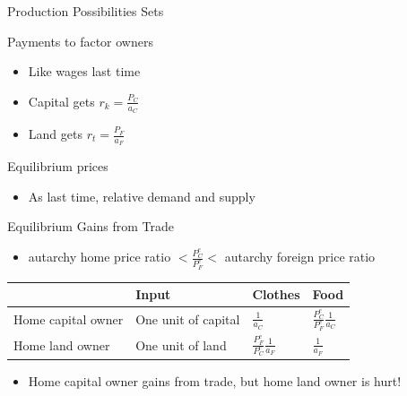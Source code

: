 \documentclass[ignorenonframetext,]{beamer}
\begin{document}
\begin{frame}{Production Possibilities Sets}

\end{frame}

\begin{frame}{Payments to factor owners}

    \begin{itemize}
        \item Like wages last time 
        \item Capital gets $r_k = \frac{P_C}{a_C}$
        \item Land gets $r_t = \frac{P_F}{a_F}$
    \end{itemize}

\end{frame}

\begin{frame}{Equilibrium prices}

    \begin{itemize}
        \item As last time, relative demand and supply
    \end{itemize}

\end{frame}

\begin{frame}{Equilibrium Gains from Trade}

    \begin{itemize}
        \item autarchy home price ratio $< \frac{P_C^e}{P_F^e} <$ autarchy foreign price ratio
    \end{itemize}
    \begin{center}
        \begin{tabular}{llll}
            \hline \hline
                               & Input               & Clothes                            & Food \\ \hline
            Home capital owner & One unit of capital & $\frac{1}{a_C}$                    & $\frac{P^e_C}{P^e_F}\frac{1}{a_C}$ \\
            Home land owner    & One unit of land    & $\frac{P^e_F}{P^e_C}\frac{1}{a_F}$ & $\frac{1}{a_F}$  \\
            \hline
        \end{tabular}
    \end{center}
    \begin{itemize}
        \item Home capital owner gains from trade, but home land owner is hurt!
    \end{itemize}

\end{frame}
\end{document}
